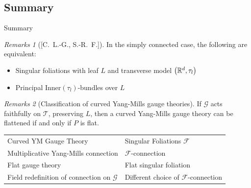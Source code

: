 \documentclass[hyperref={pdfpagelabels=false}]{beamer}
\theoremstyle{plain}
\theoremstyle{remark}
\newtheorem*{remark}{Remarks}
\begin{document}
{{\subsection{Summary}

\begin{frame}{Summary}
\begin{remark}[{[C.\ L.-G., S.-R.\ F.]}]
In the simply connected case, the following are equivalent:
\begin{itemize}
	\item Singular foliations with leaf $L$ and transverse model $\mleft(\mathbb{R}^d, \tau_l\mright)$
	\item Principal $\mathrm{Inner}(\tau_l)$-bundles over $L$
\end{itemize}
\end{remark}

\end{frame}

\begin{frame}
\begin{remark}[Classification of curved Yang-Mills gauge theories]
If $\mathcal{G}$ acts faithfully on $\mathcal{T}$, preserving $L$, then a curved Yang-Mills gauge theory can be flattened if and only if $P$ is flat.
\end{remark}

\begin{table}[h!]
		\begin{tabularx}{\textwidth}{X X}
			\rowcolor{gray}
			Curved YM Gauge Theory & Singular Foliations $\mathcal{F}$ \\
			Multiplicative Yang-Mills connection & $\mathcal{F}$-connection \\
			\rowcolor{Gray}
			Flat gauge theory & Flat singular foliation \\
			Field redefinition of connection on $\mathcal{G}$ & Different choice of $\mathcal{F}$-connection
		\end{tabularx}
\end{table}
\end{frame}

}

}
\end{document}
